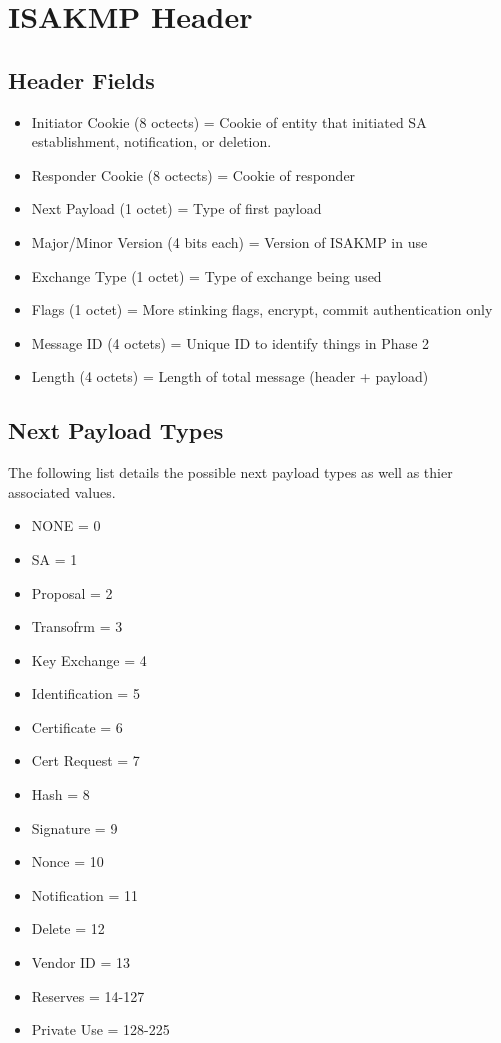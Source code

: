 \documentclass{report}
\newcommand{\squash}{\itemsep=0pt\parskip=0pt}
\begin{document}
\section {ISAKMP Header}

\subsection {Header Fields}

\begin{itemize}
   \squash
\item Initiator Cookie (8 octects) = Cookie of entity that initiated SA establishment, notification, or deletion.
\item Responder Cookie (8 octects) = Cookie of responder 
\item Next Payload (1 octet) = Type of first payload
\item Major/Minor Version (4 bits each) = Version of ISAKMP in use
\item Exchange Type (1 octet) = Type of exchange being used
\item Flags (1 octet) = More stinking flags, encrypt, commit authentication only
\item Message ID (4 octets) = Unique ID to identify things in Phase 2
\item Length (4 octets) = Length of total message (header + payload)
\end{itemize}

\subsection {Next Payload Types}

The following list details the possible next payload types as well as thier associated values.

\begin{itemize}
  \squash
\item NONE = 0
\item SA = 1
\item Proposal = 2
\item Transofrm = 3
\item Key Exchange = 4
\item Identification = 5
\item Certificate = 6
\item Cert Request = 7
\item Hash = 8
\item Signature = 9
\item Nonce = 10
\item Notification = 11
\item Delete = 12
\item Vendor ID = 13
\item Reserves = 14-127
\item Private Use = 128-225
\end{itemize}
\end{document}
